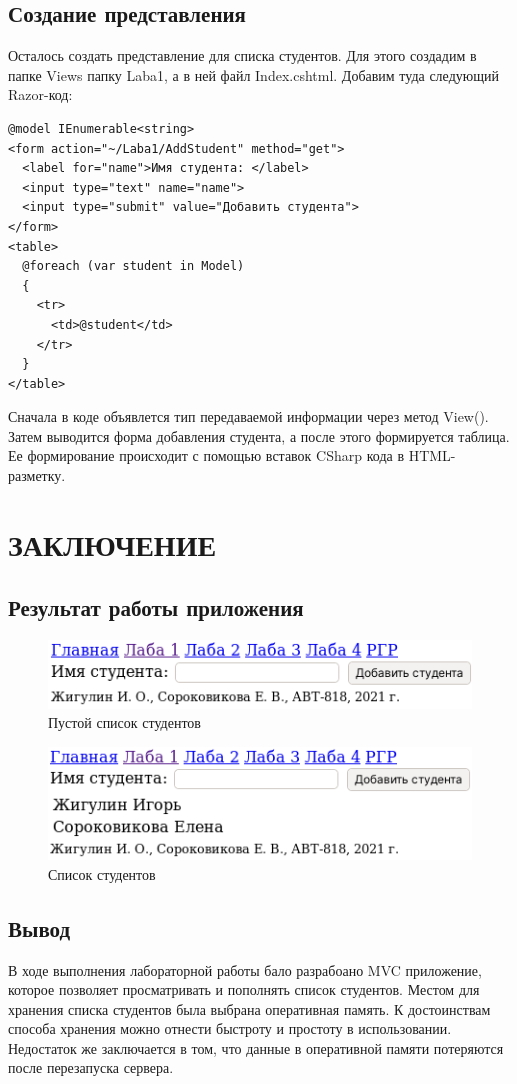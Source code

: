 \documentclass[a4paper,14pt]{extreport}
\begin{document}
\section{Создание представления}
Осталось создать представление для списка студентов. Для этого создадим в папке Views папку Laba1, а в ней файл Index.cshtml. Добавим туда следующий Razor-код:

\lstset{language=HTML}
\lstset{extendedchars=\true}
\begin{lstlisting}[basicstyle=\small]
@model IEnumerable<string>
<form action="~/Laba1/AddStudent" method="get">
  <label for="name">Имя студента: </label>
  <input type="text" name="name">
  <input type="submit" value="Добавить студента">
</form>
<table>
  @foreach (var student in Model)
  { 
    <tr>
      <td>@student</td>
    </tr>
  }
</table>
\end{lstlisting}

Сначала в коде объявлется тип передаваемой информации через метод View(). Затем выводится форма добавления студента, а после этого формируется таблица. Ее формирование происходит с помощью вставок CSharp кода в HTML-разметку.




\chapter{ЗАКЛЮЧЕНИЕ}


\section{Результат работы приложения}

\begin{figure}[H]
	\centering
	\includegraphics{before}
	\caption{Пустой список студентов}
\end{figure}

\begin{figure}[H]
	\centering
	\includegraphics{after}
	\caption{Список студентов}
\end{figure}



\section{Вывод}
В ходе выполнения лабораторной работы бало разрабоано MVC приложение, которое позволяет просматривать и пополнять список студентов. Местом для хранения списка студентов была выбрана оперативная память. К достоинствам способа хранения можно отнести быстроту и простоту в использовании. Недостаток же заключается в том, что данные в оперативной памяти потеряются после перезапуска сервера.
\end{document}
